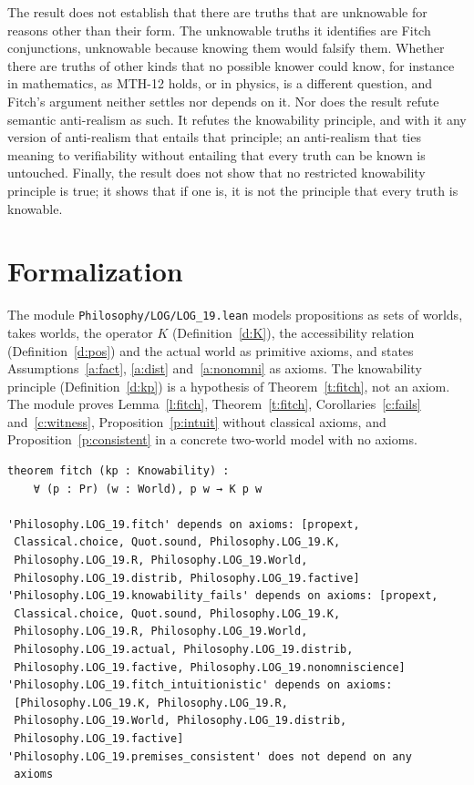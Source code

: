 \documentclass{situationist-preprint}
\begin{document}
The result does not establish that there are truths that are unknowable for reasons other than their form. The unknowable truths it identifies are Fitch conjunctions, unknowable because knowing them would falsify them. Whether there are truths of other kinds that no possible knower could know, for instance in mathematics, as MTH-12 holds, or in physics, is a different question, and Fitch's argument neither settles nor depends on it. Nor does the result refute semantic anti-realism as such. It refutes the knowability principle, and with it any version of anti-realism that entails that principle; an anti-realism that ties meaning to verifiability without entailing that every truth can be known is untouched. Finally, the result does not show that no restricted knowability principle is true; it shows that if one is, it is not the principle that every truth is knowable.

\section{Formalization}

The module \nolinkurl{Philosophy/LOG/LOG_19.lean} models propositions as sets of worlds, takes worlds, the operator $K$ (Definition~\ref{d:K}), the accessibility relation (Definition~\ref{d:pos}) and the actual world as primitive axioms, and states Assumptions~\ref{a:fact}, \ref{a:dist} and~\ref{a:nonomni} as axioms. The knowability principle (Definition~\ref{d:kp}) is a hypothesis of Theorem~\ref{t:fitch}, not an axiom. The module proves Lemma~\ref{l:fitch}, Theorem~\ref{t:fitch}, Corollaries~\ref{c:fails} and~\ref{c:witness}, Proposition~\ref{p:intuit} without classical axioms, and Proposition~\ref{p:consistent} in a concrete two-world model with no axioms.

\begin{lstlisting}
theorem fitch (kp : Knowability) :
    ∀ (p : Pr) (w : World), p w → K p w

'Philosophy.LOG_19.fitch' depends on axioms: [propext,
 Classical.choice, Quot.sound, Philosophy.LOG_19.K,
 Philosophy.LOG_19.R, Philosophy.LOG_19.World,
 Philosophy.LOG_19.distrib, Philosophy.LOG_19.factive]
'Philosophy.LOG_19.knowability_fails' depends on axioms: [propext,
 Classical.choice, Quot.sound, Philosophy.LOG_19.K,
 Philosophy.LOG_19.R, Philosophy.LOG_19.World,
 Philosophy.LOG_19.actual, Philosophy.LOG_19.distrib,
 Philosophy.LOG_19.factive, Philosophy.LOG_19.nonomniscience]
'Philosophy.LOG_19.fitch_intuitionistic' depends on axioms:
 [Philosophy.LOG_19.K, Philosophy.LOG_19.R,
 Philosophy.LOG_19.World, Philosophy.LOG_19.distrib,
 Philosophy.LOG_19.factive]
'Philosophy.LOG_19.premises_consistent' does not depend on any
 axioms
\end{lstlisting}
\end{document}
